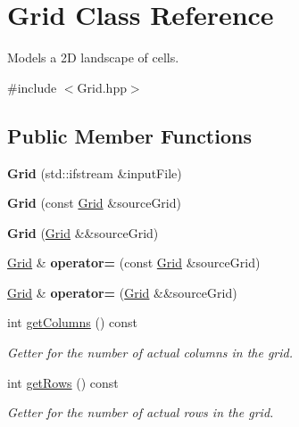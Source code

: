 \hypertarget{class_grid}{}\section{Grid Class Reference}
\label{class_grid}


Models a 2D landscape of cells.  




{\ttfamily \#include $<$Grid.\+hpp$>$}

\subsection*{Public Member Functions}
\begin{DoxyCompactItemize}
\item 
\mbox{\label{class_grid_a88ab1ccc8100827b4da40e62b7b77e96}} 
{\bfseries Grid} (std\+::ifstream \&input\+File)
\item 
\mbox{\label{class_grid_a2be5432331273bc420c252ea09631965}} 
{\bfseries Grid} (const \hyperlink{class_grid}{Grid} \&source\+Grid)
\item 
\mbox{\label{class_grid_a3828d0bf34f6c97ed93adc84d4ce6c4b}} 
{\bfseries Grid} (\hyperlink{class_grid}{Grid} \&\&source\+Grid)
\item 
\mbox{\label{class_grid_aae7b118be13f65bf2e3a72881d8a06df}} 
\hyperlink{class_grid}{Grid} \& {\bfseries operator=} (const \hyperlink{class_grid}{Grid} \&source\+Grid)
\item 
\mbox{\label{class_grid_a9f84434eb37abc5cd0979cd609b2a2d8}} 
\hyperlink{class_grid}{Grid} \& {\bfseries operator=} (\hyperlink{class_grid}{Grid} \&\&source\+Grid)
\item 
int \hyperlink{class_grid_aee0114021b6858483965cc1bffd7b88b}{get\+Columns} () const
\begin{DoxyCompactList}\small\item\em Getter for the number of actual columns in the grid. \end{DoxyCompactList}\item 
int \hyperlink{class_grid_aa9397afb775457f87b9096acf6082383}{get\+Rows} () const
\begin{DoxyCompactList}\small\item\em Getter for the number of actual rows in the grid. \end{DoxyCompactList}\item 

\end{DoxyCompactItemize}
